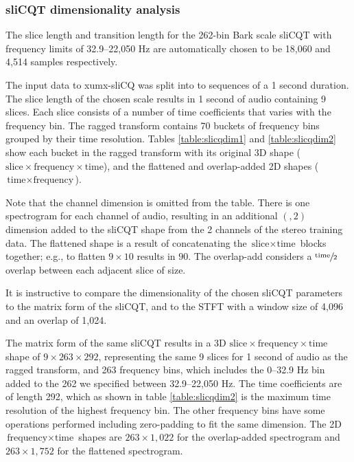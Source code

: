\documentclass[report.tex]{subfiles}
\begin{document}
\subsubsection{sliCQT dimensionality analysis}

The slice length and transition length for the 262-bin Bark scale sliCQT with frequency limits of 32.9--22,050 Hz are automatically chosen to be 18,060 and 4,514 samples respectively.

The input data to xumx-sliCQ was split into to sequences of a 1 second duration. The slice length of the chosen scale results in 1 second of audio containing 9 slices. Each slice consists of a number of time coefficients that varies with the frequency bin. The ragged transform contains 70 buckets of frequency bins grouped by their time resolution. Tables \ref{table:slicqdim1} and \ref{table:slicqdim2} show each bucket in the ragged transform with its original 3D shape ($\text{slice} \times \text{frequency} \times \text{time}$), and the flattened and overlap-added 2D shapes ($\text{time} \times \text{frequency}$).

Note that the channel dimension is omitted from the table. There is one spectrogram for each channel of audio, resulting in an additional $(,2)$ dimension added to the sliCQT shape from the 2 channels of the stereo training data. The flattened shape is a result of concatenating the $\text{slice} \times \text{time}$ blocks together; e.g., to flatten $9 \times 10$ results in $90$. The overlap-add considers a $\sfrac{\text{time}}{2}$ overlap between each adjacent slice of size.

It is instructive to compare the dimensionality of the chosen sliCQT parameters to the matrix form of the sliCQT, and to the STFT with a window size of 4,096 and an overlap of 1,024.

The matrix form of the same sliCQT results in a 3D $\text{slice} \times \text{frequency} \times \text{time}$ shape of $9 \times 263 \times 292$, representing the same 9 slices for 1 second of audio as the ragged transform, and 263 frequency bins, which includes the 0--32.9 Hz bin added to the 262 we specified between 32.9--22,050 Hz. The time coefficients are of length 292, which as shown in table \ref{table:slicqdim2} is the maximum time resolution of the highest frequency bin. The other frequency bins have some operations performed including zero-padding to fit the same dimension. The 2D $\text{frequency} \times \text{time}$ shapes are $263 \times 1{,}022$ for the overlap-added spectrogram and $263 \times 1{,}752$ for the flattened spectrogram.
\end{document}
